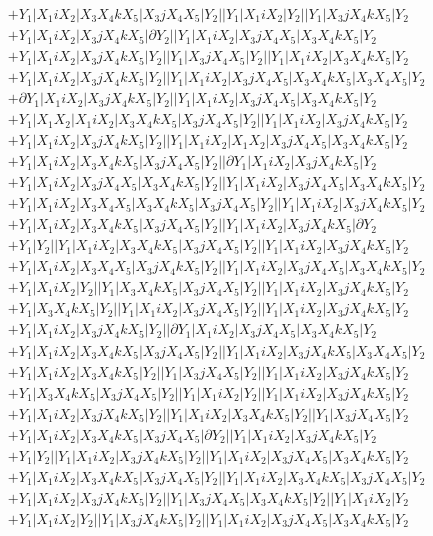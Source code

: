 \documentclass{article}[12pt]
\begin{document}
\begin{align*}
 & +Y_1|X_1iX_2|X_3X_4kX_5|X_3jX_4X_5|Y_2||Y_1|X_1iX_2|Y_2||Y_1|X_3jX_4kX_5|Y_2\\ 
 & +Y_1|X_1iX_2|X_3jX_4kX_5|\partial Y_2||Y_1|X_1iX_2|X_3jX_4X_5|X_3X_4kX_5|Y_2\\ 
 & +Y_1|X_1iX_2|X_3jX_4kX_5|Y_2||Y_1|X_3jX_4X_5|Y_2||Y_1|X_1iX_2|X_3X_4kX_5|Y_2\\ 
 & +Y_1|X_1iX_2|X_3jX_4kX_5|Y_2||Y_1|X_1iX_2|X_3jX_4X_5|X_3X_4kX_5|X_3X_4X_5|Y_2\\ 
 & +\partial Y_1|X_1iX_2|X_3jX_4kX_5|Y_2||Y_1|X_1iX_2|X_3jX_4X_5|X_3X_4kX_5|Y_2\\ 
 & +Y_1|X_1X_2|X_1iX_2|X_3X_4kX_5|X_3jX_4X_5|Y_2||Y_1|X_1iX_2|X_3jX_4kX_5|Y_2\\ 
 & +Y_1|X_1iX_2|X_3jX_4kX_5|Y_2||Y_1|X_1iX_2|X_1X_2|X_3jX_4X_5|X_3X_4kX_5|Y_2\\ 
 & +Y_1|X_1iX_2|X_3X_4kX_5|X_3jX_4X_5|Y_2||\partial Y_1|X_1iX_2|X_3jX_4kX_5|Y_2\\ 
 & +Y_1|X_1iX_2|X_3jX_4X_5|X_3X_4kX_5|Y_2||Y_1|X_1iX_2|X_3jX_4X_5|X_3X_4kX_5|Y_2\\ 
 & +Y_1|X_1iX_2|X_3X_4X_5|X_3X_4kX_5|X_3jX_4X_5|Y_2||Y_1|X_1iX_2|X_3jX_4kX_5|Y_2\\ 
 & +Y_1|X_1iX_2|X_3X_4kX_5|X_3jX_4X_5|Y_2||Y_1|X_1iX_2|X_3jX_4kX_5|\partial Y_2\\ 
 & +Y_1|Y_2||Y_1|X_1iX_2|X_3X_4kX_5|X_3jX_4X_5|Y_2||Y_1|X_1iX_2|X_3jX_4kX_5|Y_2\\ 
 & +Y_1|X_1iX_2|X_3X_4X_5|X_3jX_4kX_5|Y_2||Y_1|X_1iX_2|X_3jX_4X_5|X_3X_4kX_5|Y_2\\ 
 & +Y_1|X_1iX_2|Y_2||Y_1|X_3X_4kX_5|X_3jX_4X_5|Y_2||Y_1|X_1iX_2|X_3jX_4kX_5|Y_2\\ 
 & +Y_1|X_3X_4kX_5|Y_2||Y_1|X_1iX_2|X_3jX_4X_5|Y_2||Y_1|X_1iX_2|X_3jX_4kX_5|Y_2\\ 
 & +Y_1|X_1iX_2|X_3jX_4kX_5|Y_2||\partial Y_1|X_1iX_2|X_3jX_4X_5|X_3X_4kX_5|Y_2\\ 
 & +Y_1|X_1iX_2|X_3X_4kX_5|X_3jX_4X_5|Y_2||Y_1|X_1iX_2|X_3jX_4kX_5|X_3X_4X_5|Y_2\\ 
 & +Y_1|X_1iX_2|X_3X_4kX_5|Y_2||Y_1|X_3jX_4X_5|Y_2||Y_1|X_1iX_2|X_3jX_4kX_5|Y_2\\ 
 & +Y_1|X_3X_4kX_5|X_3jX_4X_5|Y_2||Y_1|X_1iX_2|Y_2||Y_1|X_1iX_2|X_3jX_4kX_5|Y_2\\ 
 & +Y_1|X_1iX_2|X_3jX_4kX_5|Y_2||Y_1|X_1iX_2|X_3X_4kX_5|Y_2||Y_1|X_3jX_4X_5|Y_2\\ 
 & +Y_1|X_1iX_2|X_3X_4kX_5|X_3jX_4X_5|\partial Y_2||Y_1|X_1iX_2|X_3jX_4kX_5|Y_2\\ 
 & +Y_1|Y_2||Y_1|X_1iX_2|X_3jX_4kX_5|Y_2||Y_1|X_1iX_2|X_3jX_4X_5|X_3X_4kX_5|Y_2\\ 
 & +Y_1|X_1iX_2|X_3X_4kX_5|X_3jX_4X_5|Y_2||Y_1|X_1iX_2|X_3X_4kX_5|X_3jX_4X_5|Y_2\\ 
 & +Y_1|X_1iX_2|X_3jX_4kX_5|Y_2||Y_1|X_3jX_4X_5|X_3X_4kX_5|Y_2||Y_1|X_1iX_2|Y_2\\ 
 & +Y_1|X_1iX_2|Y_2||Y_1|X_3jX_4kX_5|Y_2||Y_1|X_1iX_2|X_3jX_4X_5|X_3X_4kX_5|Y_2\end{align*}
\end{document}
